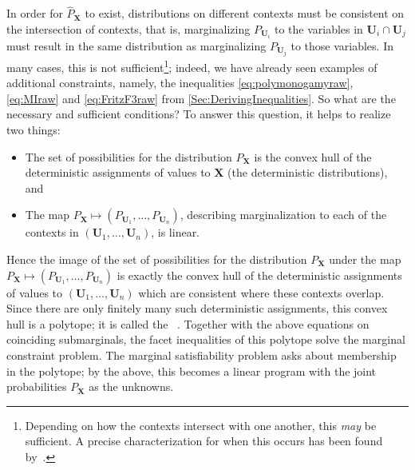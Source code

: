 \documentclass[aps,english,superscriptaddress,onecolumn,twoside,longbibliography,pra,floatfix,fleqn,nofootinbib]{revtex4-1}%
\newcommand*{\tblue}[1]{{\color{MidnightBlue}{\textbf{#1}}}}
\theoremstyle{definition}
\newcounter{example}[section]
\begin{document}
In order for $\hat{P}_{\bm{X}}$ to exist,  distributions on different contexts must be consistent on the intersection of contexts, that is, marginalizing $P_{\bm{U}_i}$ to the variables in $\bm{U}_i\cap\bm{U}_j$ must result in the same distribution as marginalizing $P_{\bm{U}_j}$ to those variables.  
  In many cases, this is not sufficient\footnote{Depending on how the contexts intersect with one another, this \emph{may} be sufficient. A precise characterization for when this occurs has been found by~\citet{vorobev_extension_1960}.}; indeed, we have already seen examples of additional constraints, namely, the inequalities \eqref{eq:polymonogamyraw}, \eqref{eq:MIraw} and \eqref{eq:FritzF3raw} from \cref{Sec:DerivingInequalities}.
So what are the necessary and sufficient conditions? To answer this question, it helps to realize two things:
\begin{itemize}
	\item The set of possibilities for the distribution $P_{\bm{X}}$ is the convex hull of the deterministic assignments of values to $\bm{X}$ (the deterministic distributions), and 
	\item The map $P_{\bm{X}}\mapsto (P_{\bm{U}_1},\ldots,P_{\bm{U}_n})$, describing marginalization to each of the contexts in $(\bm{U}_1,\ldots,\bm{U}_n)$, is linear.
\end{itemize}
Hence the image of the set of possibilities for the distribution $P_{\bm{X}}$ under the map $P_{\bm{X}}\mapsto (P_{\bm{U}_1},\ldots,P_{\bm{U}_n})$ is exactly the convex hull of the deterministic assignments of values to $(\bm{U}_1,\ldots,\bm{U}_n)$ which are consistent where these contexts overlap. Since there are only finitely many such deterministic assignments, this convex hull is a polytope; it is called the \tblue{marginal polytope}~\cite{kahle_marginal_2010}. Together with the above equations on coinciding submarginals, the facet inequalities of this polytope solve the marginal constraint problem. The marginal satisfiability problem asks about membership in the polytope; by the above, this becomes a linear program with the joint probabilities $P_{\bm{X}}$ as the unknowns.
\end{document}
